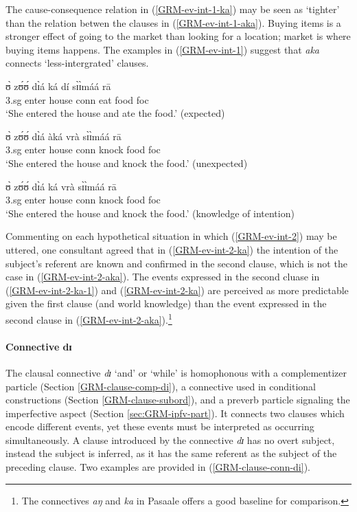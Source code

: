 The cause-consequence relation in (\ref{GRM-ev-int-1-ka}) may be seen as 
`tighter' than the relation betwen the clauses in (\ref{GRM-ev-int-1-aka}). 
Buying items is a stronger effect of going to the market than 
looking for a location; market is where buying items happens. The examples in 
(\ref{GRM-ev-int-1}) suggest that {\it aka} connects `less-intergrated' 
clauses. 
 
\ea\label{GRM-ev-int-2} 
 
\ea\label{GRM-ev-int-2-ka-1} 
\gll ʊ̀ zʊ́ʊ́ dɪ̀á ká dí sɪ̀ɪ̀máá rā\\
 {\sc 3.sg} enter house {\sc conn} eat food  {\sc foc}\\
\glt `She entered the house and ate the food.' (expected)

\ex\label{GRM-ev-int-2-aka} 
\gll  ʊ̀ zʊ́ʊ́ dɪ̀á àká vrà sɪ̀ɪ̀máá rā\\
{\sc 3.sg} enter house {\sc conn} knock food  {\sc foc}\\
\glt `She entered the house and knock the food.' (unexpected)

\ex\label{GRM-ev-int-2-ka} 
\gll ʊ̀ zʊ́ʊ́ dɪ̀á ká vrà sɪ̀ɪ̀máá rā\\
{\sc 3.sg} enter house {\sc conn} knock food  {\sc foc}\\
\glt `She entered the house and knock the food.' (knowledge of intention)

\z 
 \z

Commenting on each hypothetical situation in which (\ref{GRM-ev-int-2}) may be 
uttered, one consultant agreed 
that in (\ref{GRM-ev-int-2-ka}) the intention of the subject's referent are 
known and confirmed in the second clause, which is not the case in   
(\ref{GRM-ev-int-2-aka}). The  events expressed in the second cluase in  
(\ref{GRM-ev-int-2-ka-1}) and  (\ref{GRM-ev-int-2-ka}) are perceived as more 
predictable given the first clause (and world knowledge) than the event 
expressed in the second clause  in (\ref{GRM-ev-int-2-aka}).\footnote{The 
connectives {\it aŋ}  and {\it ka} in Pasaale \citep{mcgi99} offers a good 
baseline for comparison.}  




\paragraph{Connective dɪ}
\label{GRM-clause-coord-di}
The clausal connective {\it dɪ} `and' or `while'  is homophonous with a
complementizer particle (Section \ref{GRM-clause-comp-di}), a connective used in
conditional constructions (Section \ref{GRM-clause-subord}),   and a preverb
particle signaling the imperfective aspect (Section \ref{sec:GRM-ipfv-part}). It
connects two clauses which encode different events, yet these events must be
interpreted as occurring simultaneously.  A clause introduced by the connective
{\it dɪ} has no overt subject, instead the subject is inferred, as it has the
same referent as the subject of the preceding clause. Two examples are
provided in (\ref{GRM-clause-conn-di}). 

